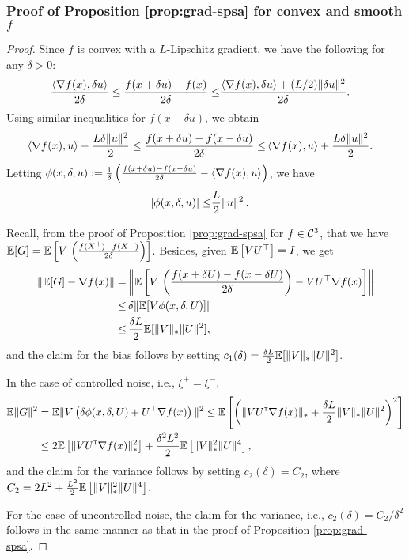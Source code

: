 \subsubsection*{Proof of Proposition \ref{prop:grad-spsa} for convex and smooth $f$}
\begin{proof}
Since $f$ is convex with a  $L$-Lipschitz gradient, we have the following for any $\delta>0$:
\begin{align*}
\frac{\left\langle\nabla f(x), \delta u\right\rangle}{2\delta} \le \frac{f(x + \delta u) -  f(x)}{2\delta} \le& \frac{\left\langle\nabla f(x), \delta u\right\rangle + (L / 2) \|\delta u\|^2}{2\delta}.
\end{align*}
Using similar inequalities for $f(x-\delta u)$, we obtain
\begin{align*}
\left\langle\nabla f(x), u\right\rangle - \frac{L \delta \| u\|^2}{2} \le \frac{f(x + \delta u) -  f(x-\delta u)}{2\delta} \le& \left\langle\nabla f(x), u\right\rangle + \frac{L \delta \| u\|^2}{2}.
\end{align*}
Letting 
$\phi(x,\delta,u):=\frac1{\delta}\left(\frac{f(x + \delta u) -  f(x-\delta u)}{2\delta} - \left\langle\nabla f(x),  u\right\rangle\right)$, we have
\begin{align*}
\left|\phi(x,\delta,u) \right| \le&  \dfrac{L}{2} \|u\|^2\,.
\end{align*}

Recall, from the proof of Proposition \ref{prop:grad-spsa} for $f\in \mathcal{C}^3$, that 
we have
$\mathbb{E}[G] =  \mathbb{E}\left[V\,  \left(\tfrac{f(X^+)  -f(X^-)}{2\delta}\right) \right]$. Besides, given $\mathbb{E}\left[V U^\top\right]=I$,  we get
\begin{align*}
 \|\mathbb{E}[G] - \nabla f(x)\| 
 =& \left\|\mathbb{E}\left[V\,  \left(\frac{f(x+\delta U)  -f(x-\delta U)}{2\delta}\right)-V U^\top\nabla f(x) \right]\right\|\\
 \le &\, \delta \|\mathbb{E}[ V \phi(x,\delta, U)]\|\\
 \le& \,\frac{\delta L}{2} \mathbb{E}[ \|V\|_* \|U\|^2],
\end{align*}
and the claim for the bias follows by setting $c_1(\delta)= \frac{\delta L}{2} \mathbb{E}[ \|V\|_* \|U\|^2]$.

In the case of controlled noise, i.e., $\xi^+ = \xi^-$, 
\begin{align*}
 \mathbb{E} \|G\|^2 
& = \mathbb{E}\|V\left(\delta \phi(x,\delta, U)+ U^\top\nabla f(x) \right)\|^2
 \le  \mathbb{E}\left[ \left( \| V U ^\mathsf{\scriptscriptstyle T} \nabla f(x)\|_* + \frac{\delta L}{2} \|V\|_* \|U\|^2 \right)^2\right]\\
& \le  2 \mathbb{E}\left[  \| V U ^\mathsf{\scriptscriptstyle T} \nabla f(x)\|_*^2\right]  + \frac{\delta^2 L^2}{2}\mathbb{E}\left[ \|V\|_*^2 \|U\|^4 \right],
\end{align*}
and the claim for the variance follows by setting $c_2(\delta) = C_2$, 
where $C_2 =  2 L^2  + \frac{ L^2}{2}\mathbb{E}\left[ \|V\|_*^2 \|U\|^4 \right]$.

For the case of uncontrolled noise, the claim for the variance, i.e., $c_2(\delta) = C_2/\delta^2$ follows in the same manner as that in the proof of Proposition \ref{prop:grad-spsa}.
\end{proof}


